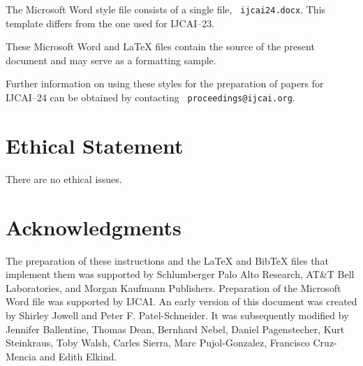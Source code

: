 \documentclass{article}
\begin{document}
The Microsoft Word style file consists of a single file, {\tt
        ijcai24.docx}. This template differs from the one used for
IJCAI--23.

These Microsoft Word and \LaTeX{} files contain the source of the
present document and may serve as a formatting sample.

Further information on using these styles for the preparation of
papers for IJCAI--24 can be obtained by contacting {\tt
        proceedings@ijcai.org}.

\appendix

\section*{Ethical Statement}

There are no ethical issues.

\section*{Acknowledgments}

The preparation of these instructions and the \LaTeX{} and Bib\TeX{}
files that implement them was supported by Schlumberger Palo Alto
Research, AT\&T Bell Laboratories, and Morgan Kaufmann Publishers.
Preparation of the Microsoft Word file was supported by IJCAI.  An
early version of this document was created by Shirley Jowell and Peter
F. Patel-Schneider.  It was subsequently modified by Jennifer
Ballentine, Thomas Dean, Bernhard Nebel, Daniel Pagenstecher,
Kurt Steinkraus, Toby Walsh, Carles Sierra, Marc Pujol-Gonzalez,
Francisco Cruz-Mencia and Edith Elkind.




\end{document}
